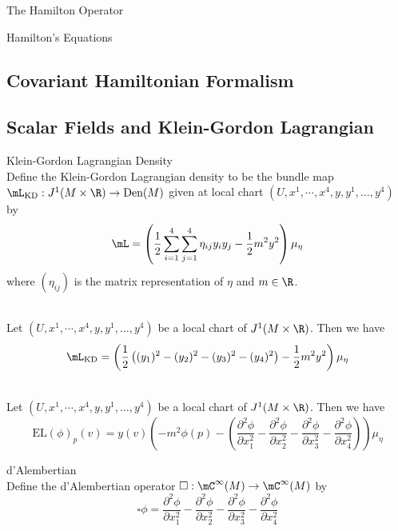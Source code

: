 \documentclass[a4paper]{article}
\begin{document}
\begin{defn}{The Hamilton Operator}{}
\end{defn}

\begin{thm}{Hamilton's Equations}{}\\

\end{thm}

\subsection{Covariant Hamiltonian Formalism}

\subsection{Scalar Fields and Klein-Gordon Lagrangian}
\begin{defn}{Klein-Gordon Lagrangian Density}{}\\
Define the Klein-Gordon Lagrangian density to be the bundle map $\mL_\text{KD}:J^1(M\times\R)\to\text{Den}(M)$ given at local chart $(U,x^1,\cdots,x^4,y,y^1,\dots,y^4)$ by $$\mL=\left(\frac{1}{2}\sum_{i=1}^4\sum_{j=1}^4\eta_{ij}y_iy_j-\frac{1}{2}m^2y^2\right)\mu_\eta$$ where $(\eta_{ij})$ is the matrix representation of $\eta$ and $m\in\R$. 
\end{defn}

\begin{lmm}{}{}\\
Let $(U,x^1,\cdots,x^4,y,y^1,\dots,y^4)$ be a local chart of $J^1(M\times\R)$. Then we have $$\mL_\text{KD}=\left(\frac{1}{2}\left((y_1)^2-(y_2)^2-(y_3)^2-(y_4)^2\right)-\frac{1}{2}m^2y^2\right)\mu_\eta$$
\end{lmm}

\begin{lmm}{}{}\\
Let $(U,x^1,\cdots,x^4,y,y^1,\dots,y^4)$ be a local chart of $J^1(M\times\R)$. Then we have $$\text{EL}(\phi)_p(v)=y(v)\left(-m^2\phi(p)-\left(\frac{\partial^2\phi}{\partial x_1^2}-\frac{\partial^2\phi}{\partial x_2^2}-\frac{\partial^2\phi}{\partial x_3^2}-\frac{\partial^2\phi}{\partial x_4^2}\right)\right)\mu_\eta$$
\end{lmm}

\begin{defn}{d'Alembertian}{}\\
Define the d'Alembertian operator $\square:\mC^\infty(M)\to\mC^\infty(M)$ by $$\square\phi=\frac{\partial^2\phi}{\partial x_1^2}-\frac{\partial^2\phi}{\partial x_2^2}-\frac{\partial^2\phi}{\partial x_3^2}-\frac{\partial^2\phi}{\partial x_4^2}$$
\end{defn}
\end{document}
